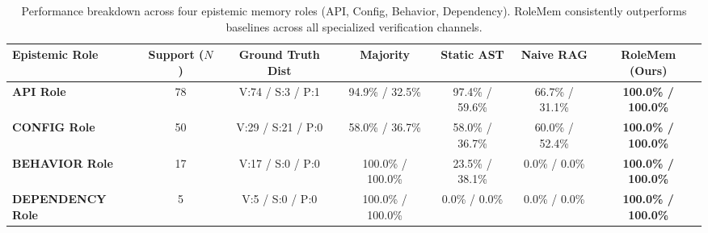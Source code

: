\begin{table}[t]
\centering
\small
\begin{tabular}{lcccccc}
\toprule
\textbf{Epistemic Role} & \textbf{Support ($N$)} & \textbf{Ground Truth Dist} & \textbf{Majority} & \textbf{Static AST} & \textbf{Naive RAG} & \textbf{RoleMem (Ours)} \\
\midrule
\textbf{API Role} & 78 & V:74 / S:3 / P:1 & 94.9\% / 32.5\% & 97.4\% / 59.6\% & 66.7\% / 31.1\% & \textbf{100.0\% / 100.0\%} \\
\textbf{CONFIG Role} & 50 & V:29 / S:21 / P:0 & 58.0\% / 36.7\% & 58.0\% / 36.7\% & 60.0\% / 52.4\% & \textbf{100.0\% / 100.0\%} \\
\textbf{BEHAVIOR Role} & 17 & V:17 / S:0 / P:0 & 100.0\% / 100.0\% & 23.5\% / 38.1\% & 0.0\% / 0.0\% & \textbf{100.0\% / 100.0\%} \\
\textbf{DEPENDENCY Role} & 5 & V:5 / S:0 / P:0 & 100.0\% / 100.0\% & 0.0\% / 0.0\% & 0.0\% / 0.0\% & \textbf{100.0\% / 100.0\%} \\
\bottomrule
\end{tabular}
\caption{Performance breakdown across four epistemic memory roles (API, Config, Behavior, Dependency). RoleMem consistently outperforms baselines across all specialized verification channels.}
\label{tab:role_analysis}
\end{table}